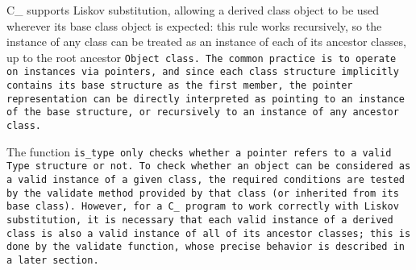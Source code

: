 C\_ supports Liskov substitution, allowing a derived class object to be used
wherever its base class object is expected: this rule works recursively,
so the instance of any class can be treated as an instance of each
of its ancestor classes, up to the root ancestor \tt{Object} class.
The common practice is to operate on instances via pointers, and since each
class structure implicitly contains its base structure as the first member, the
pointer representation can be directly interpreted as pointing to an instance
of the base structure, or recursively to an instance of any ancestor class.

The function \tt{is_type} only checks whether a
pointer refers to a valid \tt{Type} structure or not.
To check whether an object can be considered as a valid instance of
a given class, the required conditions are tested by the \tt{validate}
method provided by that class (or inherited from its base class).
However, for a C\_ program to work correctly with Liskov substitution,
it is necessary that each valid instance of a derived class is also a valid
instance of all of its ancestor classes; this is done by the \tt{validate}
function, whose precise behavior is described in a later section.

\enlargethispage*{\baselineskip}
\pagebreak
